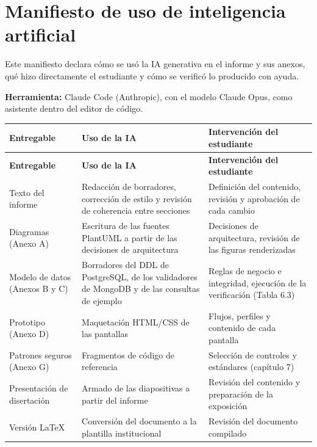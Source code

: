 \documentclass[11pt,a4paper]{article}
\begin{document}
\newpage
\section{Manifiesto de uso de inteligencia artificial}

Este manifiesto declara cómo se usó la IA generativa en el informe y sus anexos, qué hizo directamente el estudiante y cómo se verificó lo producido con ayuda.

\textbf{Herramienta:} Claude Code (Anthropic), con el modelo Claude Opus, como asistente dentro del editor de código.

\begingroup
\begin{longtable}{@{}>{\raggedright\arraybackslash\hspace{0pt}}p{}>{\raggedright\arraybackslash\hspace{0pt}}p{}>{\raggedright\arraybackslash\hspace{0pt}}p{}@{}}
\toprule
\textbf{Entregable} & \textbf{Uso de la IA} & \textbf{Intervención del estudiante} \\ \midrule
\endfirsthead
\toprule
\textbf{Entregable} & \textbf{Uso de la IA} & \textbf{Intervención del estudiante} \\ \midrule
\endhead
\bottomrule
\endlastfoot
Texto del informe & Redacción de borradores, corrección de estilo y revisión de coherencia entre secciones & Definición del contenido, revisión y aprobación de cada cambio \\ \addlinespace[0.25em]
Diagramas (Anexo A) & Escritura de las fuentes PlantUML a partir de las decisiones de arquitectura & Decisiones de arquitectura, revisión de las figuras renderizadas \\ \addlinespace[0.25em]
Modelo de datos (Anexos B y C) & Borradores del DDL de PostgreSQL, de los validadores de MongoDB y de las consultas de ejemplo & Reglas de negocio e integridad, ejecución de la verificación (Tabla 6.3) \\ \addlinespace[0.25em]
Prototipo (Anexo D) & Maquetación HTML/CSS de las pantallas & Flujos, perfiles y contenido de cada pantalla \\ \addlinespace[0.25em]
Patrones seguros (Anexo G) & Fragmentos de código de referencia & Selección de controles y estándares (capítulo 7) \\ \addlinespace[0.25em]
Presentación de disertación & Armado de las diapositivas a partir del informe & Revisión del contenido y preparación de la exposición \\ \addlinespace[0.25em]
Versión LaTeX & Conversión del documento a la plantilla institucional & Revisión del documento compilado \\
\end{longtable}
\endgroup
\end{document}
